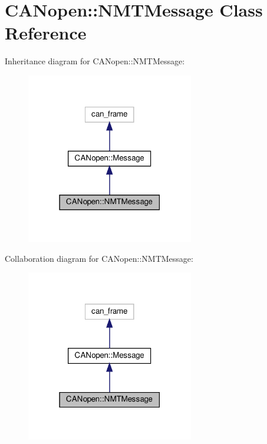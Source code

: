 \hypertarget{class_c_a_nopen_1_1_n_m_t_message}{}\section{C\+A\+Nopen\+:\+:N\+M\+T\+Message Class Reference}
\label{class_c_a_nopen_1_1_n_m_t_message}


Inheritance diagram for C\+A\+Nopen\+:\+:N\+M\+T\+Message\+:\nopagebreak
\begin{figure}[H]
\begin{center}
\leavevmode
\includegraphics[width=207pt]{class_c_a_nopen_1_1_n_m_t_message__inherit__graph}
\end{center}
\end{figure}


Collaboration diagram for C\+A\+Nopen\+:\+:N\+M\+T\+Message\+:\nopagebreak
\begin{figure}[H]
\begin{center}
\leavevmode
\includegraphics[width=207pt]{class_c_a_nopen_1_1_n_m_t_message__coll__graph}
\end{center}
\end{figure}
